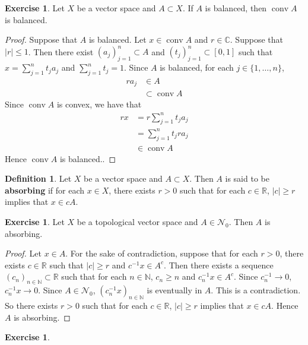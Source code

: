 \documentclass[12pt]{amsart}
\theoremstyle{definition}
\newtheorem{defn}[definition]{Definition}
\newtheorem{ex}[definition]{Exercise}
\newcommand{\C}{\mathbb{C}}
\newcommand{\N}{\mathbb{N}}
\newcommand{\R}{\mathbb{R}}
\newcommand{\MN}{\mathcal{N}}
\DeclareMathOperator{\cnv}{conv}
\begin{document}
	\begin{ex}
		Let $X$ be a vector space and $A \subset X$. If $A$ is balanced, then $\cnv A$ is balanced.
	\end{ex}

	\begin{proof}
		Suppose that $A$ is balanced. Let $x \in \cnv A$ and $r \in \C$. Suppose that $|r| \leq 1$. Then there exist $(a_j)_{j=1}^n \subset A$ and $(t_j)_{j=1}^n \subset [0,1]$ such that $x = \sum\limits_{j=1}^n t_j a_j$ and $\sum\limits_{j=1}^n t_j = 1$. Since $A$ is balanced, for each $j \in \{1, \ldots, n\}$, 
		\begin{align*}
			ra_j 
			&\in A \\
			&\subset \cnv A
		\end{align*}
		Since $\cnv A$ is convex, we have that 
		\begin{align*}
			rx 
			&= r\sum\limits_{j=1}^n t_j a_j\\
			&= \sum\limits_{j=1}^n t_j ra_j\\
			&\in \cnv A
		\end{align*}
		Hence $\cnv A$ is balanced..
	\end{proof}



	\begin{defn}
		Let $X$ be a vector space and $A \subset X$. Then $A$ is said to be \textbf{absorbing} if for each $x \in X$, there exists $r > 0$ such that for each $c \in \R$, $|c| \geq r$ implies that $x \in cA$.
	\end{defn}

	\begin{ex}
		Let $X$ be a topological vector space and $A \in \MN_0$. Then $A$ is absorbing. 
	\end{ex}

	\begin{proof}
		Let $x \in A$. For the sake of contradiction, suppose that for each $r > 0$, there exists $c \in \R$ such that $|c| \geq r$ and $c^{-1}x \in A^c$. Then there exists a sequence $(c_{n})_{n \in \N} \subset \R$ such that for each $n \in \N$, $c_n \geq n$ and $c_n^{-1}x \in A^c$. Since $c_n^{-1} \rightarrow 0$, $c_n^{-1}x \rightarrow 0$. Since $A \in \MN_0$, $(c_n^{-1}x)_{n \in \N}$ is eventually in $A$. This is a contradiction. So there exists $r > 0$ such that for each $c \in \R$, $|c| \geq r$ implies that $x \in cA$. Hence $A$ is absorbing.
	\end{proof}

	\begin{ex}
		
	\end{ex}
	
\end{document}
